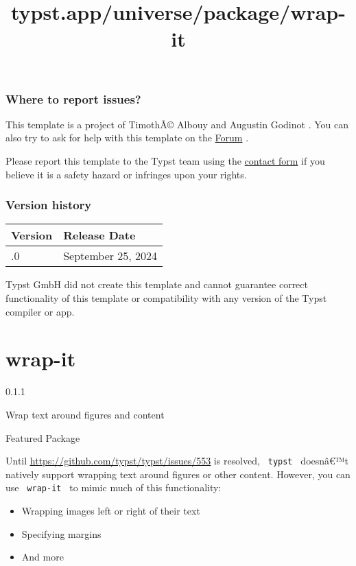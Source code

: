 \subsubsection{Where to report issues?}\label{where-to-report-issues}

This template is a project of TimothÃ© Albouy and Augustin Godinot . You
can also try to ask for help with this template on the
\href{https://forum.typst.app}{Forum} .

Please report this template to the Typst team using the
\href{https://typst.app/contact}{contact form} if you believe it is a
safety hazard or infringes upon your rights.

\label{versions}
\subsubsection{Version history}\label{version-history}

\begin{longtable}[]{@{}ll@{}}
\toprule\noalign{}
Version & Release Date \\
\midrule\noalign{}
\endhead
\bottomrule\noalign{}
\endlastfoot
0.1.0 & September 25, 2024 \\
\end{longtable}

Typst GmbH did not create this template and cannot guarantee correct
functionality of this template or compatibility with any version of the
Typst compiler or app.


\title{typst.app/universe/package/wrap-it}

\label{banner}
\section{wrap-it}\label{wrap-it}

{ 0.1.1 }

Wrap text around figures and content

{ } Featured Package

\label{readme}
Until \ul{\ul{\url{https://github.com/typst/typst/issues/553}}} is
resolved, \texttt{\ typst\ } doesnâ€™t natively support wrapping text
around figures or other content. However, you can use
\texttt{\ wrap-it\ } to mimic much of this functionality:

\begin{itemize}
\item
  Wrapping images left or right of their text
\item
  Specifying margins
\item
  And more
\end{itemize}

